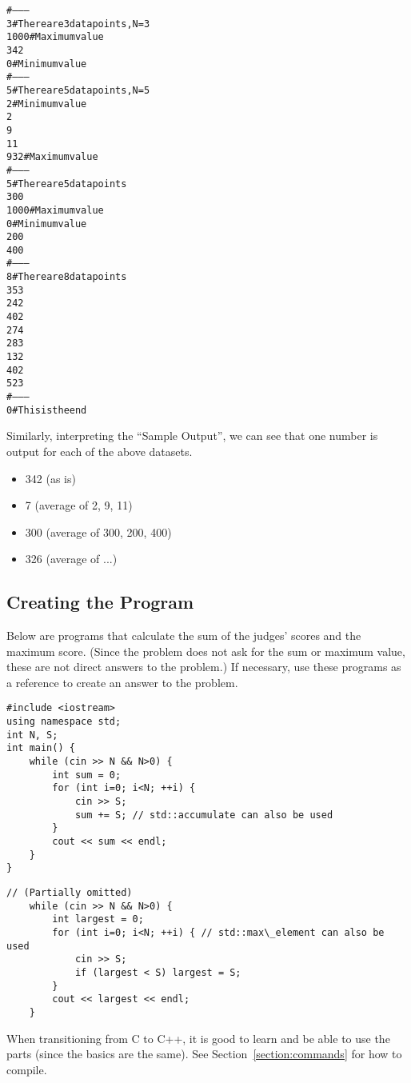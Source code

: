 \begin{alltt}
#--------
3 # There are 3 data points, N=3
1000 # Maximum value
342
0 # Minimum value
#--------
5 # There are 5 data points, N=5
2 # Minimum value
2
9
11
932 # Maximum value
#--------
5 # There are 5 data points
300
1000 # Maximum value
0 # Minimum value
200
400
#--------
8 # There are 8 data points
353
242
402
274
283
132
402
523
#--------
0 # This is the end
\end{alltt}


Similarly, interpreting the ``Sample Output'', we can see that one number is output for each of the above datasets.
\begin{itemize}
\item 342 (as is)
\item 7 (average of 2, 9, 11)
\item 300 (average of 300, 200, 400)
\item 326 (average of ...)
\end{itemize}
\subsection{Creating the Program}

Below are programs that calculate the sum of the judges' scores and the maximum score. (Since the problem does not ask for the sum or maximum value, these are not direct answers to the problem.) If necessary, use these programs as a reference to create an answer to the problem.

\begin{cbox}[emphstyle={[2]\graytext},emph={[2]iostream,using,namespace,std,cin,cout,endl}]
\begin{verbatim}
#include <iostream>
using namespace std;
int N, S;
int main() {
    while (cin >> N && N>0) {
        int sum = 0;
        for (int i=0; i<N; ++i) {
            cin >> S;
            sum += S; // std::accumulate can also be used
        }
        cout << sum << endl;
    }
}
\end{verbatim}
\end{cbox}

\begin{cbox}[emphstyle={[2]\graytext},emph={[2]iostream,using,namespace,std,cin,cout,endl}]
\begin{verbatim}
// (Partially omitted)
    while (cin >> N && N>0) {
        int largest = 0;
        for (int i=0; i<N; ++i) { // std::max\_element can also be used
            cin >> S;
            if (largest < S) largest = S;
        }
        cout << largest << endl;
    }
\end{verbatim}
\end{cbox}
When transitioning from C to C++, it is good to learn and be able to use the  parts (since the basics are the same). See Section~\ref{section:commands} for how to compile.

